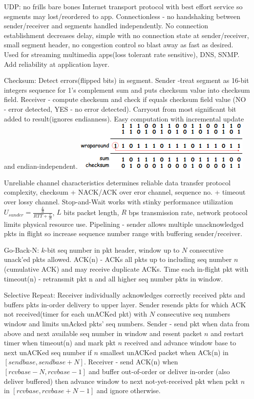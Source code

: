 \documentclass[8pt]{extarticle}
\begin{document}
\begin{multicols}{2}
UDP: no frills bare bones Internet transport protocol with best effort service so segments may lost/reordered to app. Connectionless - no handshaking between sender/receiver and segments handled independently. No connection establishment decreases delay, simple with no connection state at sender/receiver, small segment header, no congestion control so blast away as fast as desired. Used for streaming multimedia apps(loss tolerant rate sensitive), DNS, SNMP. Add reliability at application layer. 

Checksum: Detect errors(flipped bits) in segment. Sender -treat segment as 16-bit integers sequence for 1’s complement sum and puts checksum value into checksum field. Receiver - compute checksum and check if equals checksum field value (NO - error detected, YES - no error detected). Carryout from most significant bit added to result(ignores endianness). Easy computation with incremental update and endian-independent. 
\includegraphics{checksum.png}

Unreliable channel characteristics determines reliable data transfer protocol complexity, checksum + NACK/ACK over eror channel, sequence no. + timeout over lossy channel. Stop-and-Wait works with stinky performance utilization $U_{sunder} = \frac{\frac{L}{R}}{RTT + \frac{L}{R}}$, $L$ bits packet length, $R$ bps transmission rate, network protocol limits physical resource use. Pipelining - sender allows multiple unacknowledged pkts in flight so increase sequence number range with buffering sender/receiver.

Go-Back-N: $k$-bit seq number in pkt header, window up to $N$ consecutive unack’ed pkts allowed. ACK(n) - ACKs all pkts up to including seq number $n$(cumulative ACK) and may receive duplicate ACKs. Time each in-flight pkt with timeout(n) - retransmit pkt n and all higher seq number pkts in window.

Selective Repeat: Receiver individually acknowledges correctly received pkts and buffers pkts in-order delivery to upper layer. Sender resends pkts for which ACK not received(timer for each unACKed pkt) with $N$ consecutive seq numbers window and limits unAcked pkts' seq numbers. Sender - send pkt when data from above and next available seq number in window and resent packet $n$ and restart timer when timeout(n) and mark pkt $n$ received and advance window base to next unACKed seq number if $n$ smallest unACKed packet when ACk(n) in $[sendbase, sendbase+N]$. Receiver - send ACK(n) when $[rcvbase-N,rcvbase-1]$ and buffer out-of-order or deliver in-order (also deliver buffered) then advance window to next not-yet-received pkt when pckt $n$ in $[rcvbase, rcvbase+N-1]$  and ignore otherwise.


\end{multicols}
\end{document}
